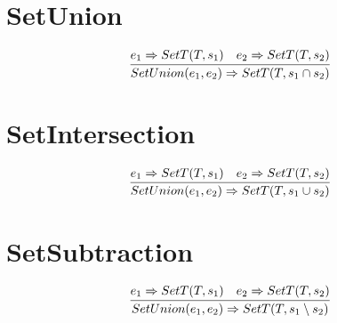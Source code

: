 \documentclass{article}
\begin{document}
\section{SetUnion}
\begin{equation*}
	\infer{SetUnion(e_1, e_2) \Rightarrow SetT(T, s_1 \cap s_2)}{e_1 \Rightarrow SetT(T, s_1) & e_2 \Rightarrow SetT(T, s_2)}
\end{equation*}
\section{SetIntersection}
\begin{equation*}
	\infer{SetUnion(e_1, e_2) \Rightarrow SetT(T, s_1 \cup s_2)}{e_1 \Rightarrow SetT(T, s_1) & e_2 \Rightarrow SetT(T, s_2)}
\end{equation*}
\section{SetSubtraction}
\begin{equation*}
	\infer{SetUnion(e_1, e_2) \Rightarrow SetT(T, s_1 \setminus s_2)}{e_1 \Rightarrow SetT(T, s_1) & e_2 \Rightarrow SetT(T, s_2)}
\end{equation*}
\end{document}
